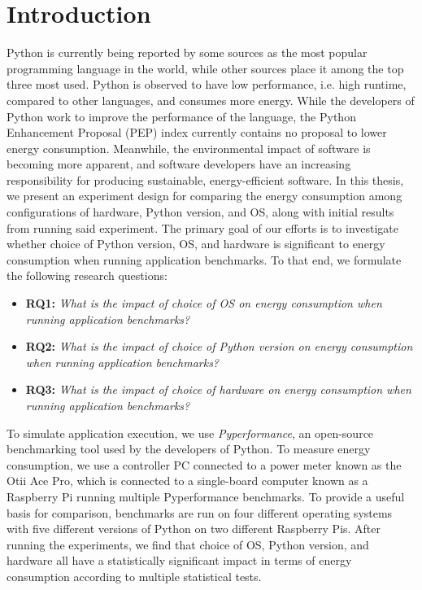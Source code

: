 \newpage
{}
\section{Introduction}
\label{sec:introduction}

Python is currently being reported by some sources as the most popular programming language in the world\cite{pypl,tiobe}, while other sources place it among the top three most used\cite{stackover, statista}. Python is observed to have low performance, i.e. high runtime, compared to other languages, and consumes more energy\cite{pereira_rank_efficiency}. While the developers of Python work to improve the performance of the language, the Python Enhancement Proposal (PEP) index currently contains no proposal to lower energy consumption\cite{pep_index}. Meanwhile, the environmental impact of software is becoming more apparent, and software developers have an increasing responsibility for producing sustainable, energy-efficient software\cite{caballar2024we}. In this thesis, we present an experiment design for comparing the energy consumption among configurations of hardware, Python version, and OS, along with initial results from running said experiment. The primary goal of our efforts is to investigate whether choice of Python version, OS, and hardware is significant to energy consumption when running application benchmarks. To that end, we formulate the following research questions:
\begin{itemize}[label={}]
    \item \textbf{RQ1:} 
    \textit{What is the impact of choice of OS on energy consumption when running application benchmarks?}
    \item \textbf{RQ2:} 
    \textit{What is the impact of choice of Python version on energy consumption when running application benchmarks?}
    \item \textbf{RQ3:}
    \textit{What is the impact of choice of hardware on energy consumption when running application benchmarks?}
\end{itemize}
To simulate application execution, we use \textit{Pyperformance}, an open-source benchmarking tool used by the developers of Python. To measure energy consumption, we use a controller PC connected to a power meter known as the Otii Ace Pro, which is connected to a single-board computer known as a Raspberry Pi running multiple Pyperformance benchmarks. To provide a useful basis for comparison, benchmarks are run on four different operating systems with five different versions of Python on two different Raspberry Pis. After running the experiments, we find that choice of OS, Python version, and hardware all have a statistically significant impact in terms of energy consumption according to multiple statistical tests.

